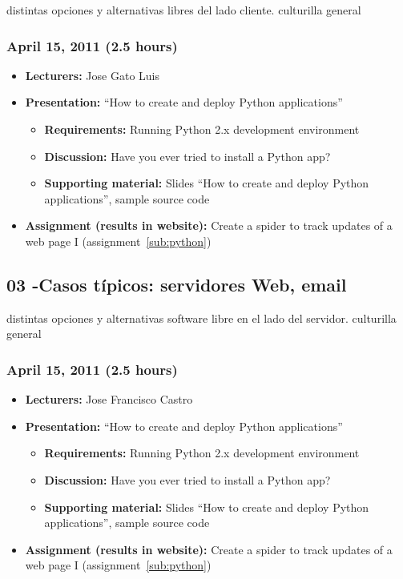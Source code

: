 \documentclass[a4paper]{article}
\begin{document}
distintas opciones y alternativas libres del lado cliente. culturilla general

\subsubsection{April 15, 2011 (2.5 hours)}

\begin{itemize}
\item \textbf{Lecturers:} Jose Gato Luis
\item \textbf{Presentation:} ``How to create and deploy Python applications''
  \begin{itemize}
\item \textbf{Requirements:} Running Python 2.x development environment
  \item \textbf{Discussion:} Have you ever tried to install a Python app?
  \item \textbf{Supporting material:} Slides ``How to create and
    deploy Python applications'', sample source code
  \end{itemize}
\item \textbf{Assignment (results in website):} Create a spider to
  track updates of a web page I (assignment~\ref{sub:python})
\end{itemize}

\subsection{03 -Casos típicos: servidores Web, email}

distintas opciones y alternativas software libre en el lado del servidor. culturilla general

\subsubsection{April 15, 2011 (2.5 hours)}

\begin{itemize}
\item \textbf{Lecturers:} Jose Francisco Castro
\item \textbf{Presentation:} ``How to create and deploy Python applications''
  \begin{itemize}
\item \textbf{Requirements:} Running Python 2.x development environment
  \item \textbf{Discussion:} Have you ever tried to install a Python app?
  \item \textbf{Supporting material:} Slides ``How to create and
    deploy Python applications'', sample source code
  \end{itemize}
\item \textbf{Assignment (results in website):} Create a spider to
  track updates of a web page I (assignment~\ref{sub:python})
\end{itemize}
\end{document}

